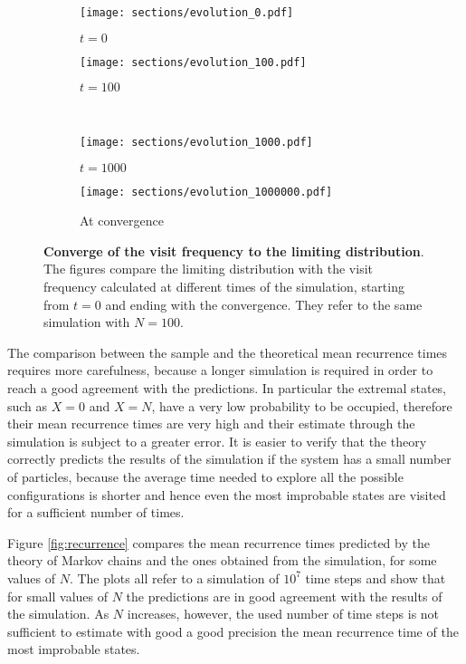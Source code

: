 \begin{figure}
  \begin{subfigure}{.5\textwidth}
      \centering
      \texttt{[image: sections/evolution\_0.pdf]}
      \caption{$t = 0$}
    \end{subfigure}
    \begin{subfigure}{.5\textwidth}
      \centering
      \texttt{[image: sections/evolution\_100.pdf]}
      \caption{$t = 100$}
    \end{subfigure}\\
    \begin{subfigure}{0.5\textwidth}
      \centering
      \texttt{[image: sections/evolution\_1000.pdf]}
      \caption{$t = 1000$}
    \end{subfigure}%
    \begin{subfigure}{0.5\textwidth}
      \centering
      \texttt{[image: sections/evolution\_1000000.pdf]}
      \caption{At convergence}
    \end{subfigure}

  \captionsetup{width=.9\linewidth}
  \caption{\textbf{Converge of the visit frequency to the limiting distribution}. The figures compare the limiting distribution with the visit frequency calculated at different times of the simulation, starting from $t = 0$ and ending with the convergence. They refer to the same simulation with $N = 100$.}
  \label{fig:evolution}
\end{figure}

\medskip
The comparison between the sample and the theoretical mean recurrence times requires more carefulness, because a longer simulation is required in order to reach a good agreement with the predictions. In particular the extremal states, such as $X = 0$ and $X = N$, have a very low probability to be occupied, therefore their mean recurrence times are very high and their estimate through the simulation is subject to a greater error. It is easier to verify that the theory correctly predicts the results of the simulation if the system has a small number of particles, because the average time needed to explore all the possible configurations is shorter and hence even the most improbable states are visited for a sufficient number of times. 

Figure \ref{fig:recurrence} compares the mean recurrence times predicted by the theory of Markov chains and the ones obtained from the simulation, for some values of $N$. The plots all refer to a simulation of $10^7$ time steps and show that for small values of $N$ the predictions are in good agreement with the results of the simulation. As $N$ increases, however, the used number of time steps is not sufficient to estimate with good a good precision the mean recurrence time of the most improbable states. 


